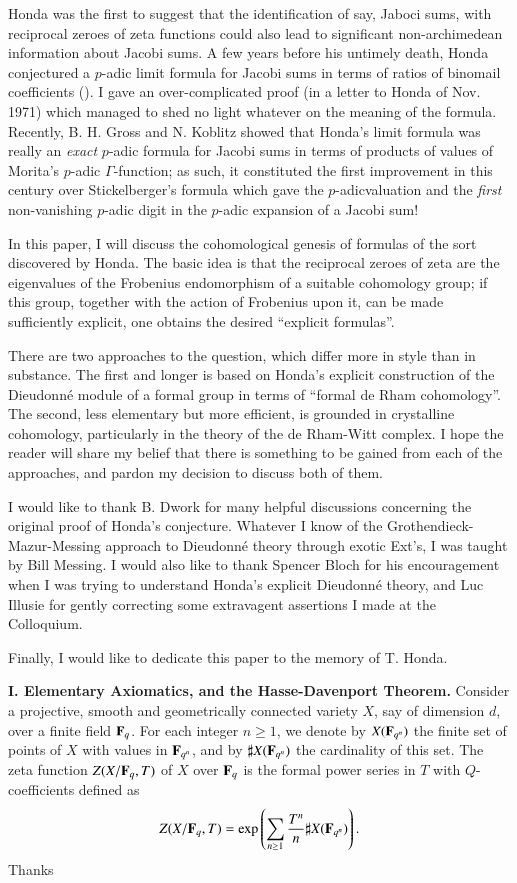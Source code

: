Honda was the first to suggest that the identification of say, Jaboci sums, with reciprocal zeroes of zeta functions could also lead to significant non-archimedean information about Jacobi sums. A few years before his untimely death, Honda conjectured a $p$-adic limit formula for Jacobi sums in terms of ratios of binomail coefficients (\cite{art6-key23}). I gave an over-complicated proof (in a letter to Honda of Nov. 1971) which managed to shed no light whatever on the meaning of the formula. Recently, B. H. Gross and N. Koblitz \cite{art6-key14} showed that Honda's limit formula was really an {\em exact} $p$-adic formula for Jacobi sums in terms of products of values of Morita's $p$-adic $\Gamma$-function; as such, it constituted the first improvement in this century over Stickelberger's formula which gave the $p$-adic\pageoriginale valuation and the {\em first} non-vanishing $p$-adic digit in the $p$-adic expansion of a Jacobi sum!

In this paper, I will discuss the cohomological genesis of formulas of the sort discovered by Honda. The basic idea is that the reciprocal zeroes of zeta are the eigenvalues of the Frobenius endomorphism of a suitable cohomology group; if this group, together with the action of Frobenius upon it, can be made sufficiently explicit, one obtains the desired ``explicit formulas''.

There are two approaches to the question, which differ more in style than in substance. The first and longer is based on Honda's explicit construction of the Dieudonn\'e module of a formal group in terms of ``formal de Rham cohomology''. The second, less elementary but more efficient, is grounded in crystalline cohomology, particularly in the theory of the de Rham-Witt complex. I hope the reader will share my belief that there is something to be gained from each of the approaches, and pardon my decision to discuss both of them.

I would like to thank B. Dwork for many helpful discussions concerning the original proof of Honda's conjecture. Whatever I know of the Grothendieck-Mazur-Messing approach to Dieudonn\'e theory through exotic Ext's, I was taught by Bill Messing. I would also like to thank Spencer Bloch for his encouragement when I was trying to understand Honda's explicit Dieudonn\'e theory, and Luc Illusie for gently correcting some extravagent assertions I made at the Colloquium.

Finally, I would like to dedicate this paper to the memory of T. Honda.

\medskip
\noindent
{\bf I. Elementary Axiomatics, and the Hasse-Davenport Theorem.}
Consider a projective, smooth and geometrically connected variety $X$, say of dimension $d$, over a finite field $\mathbf{F}_{q}$. For each integer $n\geq 1$, we denote by $X(\mathbf{F}_{q^{n}})$ the finite set of points of $X$ with values in $\mathbf{F}_{q^{n}}$, and by $\sharp X(\mathbf{F}_{q^{n}})$ the cardinality of this set. The zeta function $Z(X/\mathbf{F}_{q},T)$ of $X$ over $\mathbf{F}_{q}$ is the formal power series in $T$ with $Q$-coefficients defined as
$$
Z(X/\mathbf{F}_{q},T)=\exp \left(\sum\limits_{n\geq 1}\frac{T^{n}}{n}\sharp X(\mathbf{F}_{q^{n}})\right).
$$
Thanks\pageoriginale %
